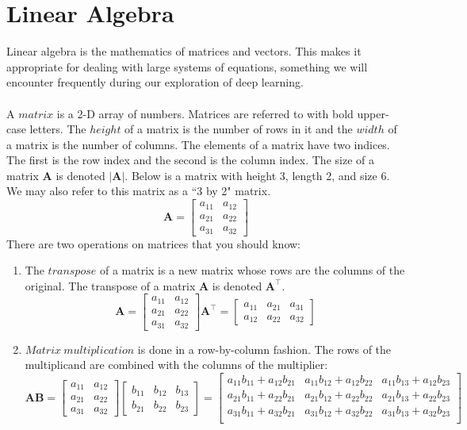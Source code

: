 \documentclass[a4paper]{article}
\begin{document}
\section{Linear Algebra}
Linear algebra is the mathematics of matrices and vectors. This makes it appropriate for dealing with large systems of equations, something we will encounter frequently during our exploration of deep learning.
\\ \\
\noindent
A $matrix$ is a 2-D array of numbers. Matrices are referred to with bold upper-case letters. The $height$ of a matrix is the number of rows in it and the $width$ of a matrix is the number of columns. The elements of a matrix have two indices. The first is the row index and the second is the column index. The size of a matrix $\bm{A}$ is denoted $\vert\bm{A}\vert$. Below is a matrix with height 3, length 2, and size 6. We may also refer to this matrix as a ``3 by 2" matrix.
\[
\bm{A} = \begin{bmatrix}
    a_{11}       & a_{12} \\
    a_{21} & a_{22} \\
    a_{31} & a_{32}
\end{bmatrix}
\]
There are two operations on matrices that you should know:
\begin{enumerate}
\item The $transpose$ of a matrix is a new matrix whose rows are the columns of the original. The transpose of a matrix $\bm{A}$ is denoted $\bm{A}^{\intercal}$.
\[
\bm{A} = \begin{bmatrix}
    a_{11}       & a_{12} \\
    a_{21} & a_{22} \\
    a_{31} & a_{32}
\end{bmatrix}
\bm{A}^{\intercal} = \begin{bmatrix}
a_{11} & a_{21} & a_{31} \\
a_{12} & a_{22} & a_{32}
\end{bmatrix}
\]
\item $Matrix\ multiplication$ is done in a row-by-column fashion. The rows of the multiplicand are combined with the columns of the multiplier:
\[
\bm{A} \bm{B}= 
\begin{bmatrix}
    a_{11}       & a_{12} \\
    a_{21} & a_{22} \\
    a_{31} & a_{32}
\end{bmatrix}
\begin{bmatrix}
b_{11} & b_{12} & b_{13}\\
b_{21} & b_{22} & b_{23}
\end{bmatrix}
= 
\begin{bmatrix}
a_{11} b_{11} + a_{12} b_{21} & a_{11} b_{12} + a_{12} b_{22} & a_{11} b_{13} + a_{12} b_{23} \\
a_{21} b_{11} + a_{22} b_{21} & a_{21} b_{12} + a_{22} b_{22} & a_{21} b_{13} + a_{22} b_{23}\\
a_{31} b_{11} + a_{32} b_{21} & a_{31} b_{12} + a_{32} b_{22} & a_{31} b_{13} + a_{32} b_{23}\\
\end{bmatrix}
\]
\end{enumerate}
\end{document}
